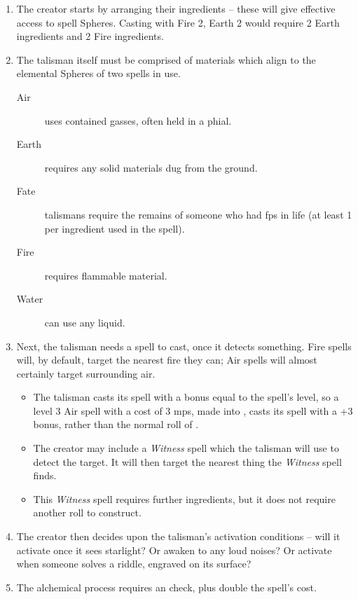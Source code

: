 \begin{multicols}{2}
\begin{enumerate}
  \item
  The creator starts by arranging their \glspl{ingredient} -- these will give effective access to spell Spheres.
  Casting with Fire 2, Earth 2 would require 2 Earth \glspl{ingredient} and 2 Fire \glspl{ingredient}.
  \item
  The talisman itself must be comprised of materials which align to the elemental Spheres of two spells in use.
  \begin{description}
    \item[Air]
    uses contained gasses, often held in a phial.
    \item[Earth]
    requires any solid materials dug from the ground.
    \item[Fate]
    talismans require the remains of someone who had \glspl{fp} in life (at least 1 per \gls{ingredient} used in the spell).
    \item[Fire]
    requires flammable material.
    \item[Water]
    can use any liquid.
  \end{description}
  \item
  Next, the \gls{talisman} needs a spell to cast, once it detects something.
  Fire spells will, by default, target the nearest fire they can; Air spells will almost certainly target surrounding air.
  \begin{itemize}
    \item
    The \gls{talisman} casts its spell with a bonus equal to the spell's level, so a level 3 Air spell with a cost of 3 \glspl{mp}, made into , casts its spell with a +3 bonus, rather than the normal roll of .
    \item
    The creator may include a \textit{Witness} spell which the \gls{talisman} will use to detect the target.
    It will then target the nearest thing the \textit{Witness} spell finds.
    \item
    This \textit{Witness} spell requires further \glspl{ingredient}, but it does not require another roll to construct.
  \end{itemize}
  \item
  The creator then decides upon the talisman's activation conditions -- will it activate once it sees starlight?
  Or awaken to any loud noises?
  Or activate when someone solves a riddle, engraved on its surface?
  \item
  The alchemical process requires an  check, \tn[10] plus double the spell's cost.
\end{enumerate}


\end{multicols}
